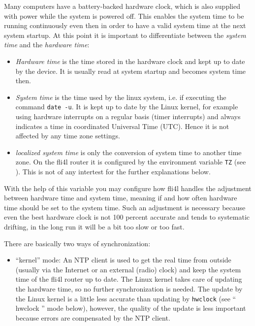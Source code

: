\begin{description}
{  Many computers have a battery-backed hardware clock, which is also supplied with power
  while the system is powered off. This enables the system time to be running continuously
  even then in order to have a valid system time at the next system startup.
  At this point it is important to differentiate between the \emph{system time}
  and the \emph{hardware time}:
 
  \begin{itemize}
  \item \emph{Hardware time} is the time stored in the hardware clock
  and kept up to date by the device. It is usually read at system startup and
  becomes system time then.

  \item \emph{System time} is the time used by the linux system, i.e. if executing
  the command \texttt{date -u}. It is kept up to date by the Linux kernel, for example
  using hardware interrupts on a regular basis (timer interrupts) and always
  indicates a time in coordinated Universal Time (UTC). Hence it is not affected
  by any time zone settings.
 
  \item \emph{localized system time} is only the conversion of system time to
  another time zone. On the fli4l router it is configured by the environment
  variable \texttt{TZ} (see ). This is not of
  any intertest for the further explanations below.
  \end{itemize}
  
  With the help of this variable you may configure how fli4l handles the adjustment
  between hardware time and system time, meaning if and how often hardware time
  should be set to the system time. Such an adjustment is necessary because even
  the best hardware clock is not 100 percent accurate and tends to systematic
  drifting, in the long run it will be a bit too slow or too fast.
  
  There are basically two ways of synchronization:
  
  \begin{itemize}
  \item ``kernel'' mode: An NTP client is used to get the real time from outside
  (usually via the Internet or an external (radio) clock) and keep the system 
  time of the fli4l router up to date. The Linux kernel takes care of updating
  the hardware time, so no further synchronization is needed. The update by the
  Linux kernel is a little less accurate than updating by \texttt{hwclock}
  (see `` hwclock '' mode below), however, the quality of the update is
  less important because errors are compensated by the NTP client.
  

\end{itemize}}
\end{description}
